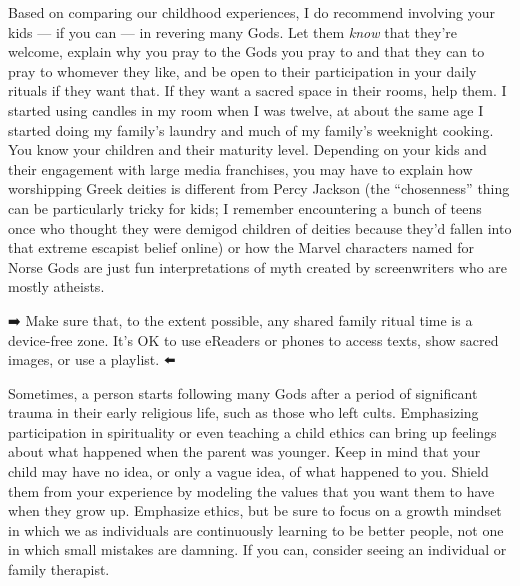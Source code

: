 \documentclass[
]{book}
\begin{document}
Based on comparing our childhood experiences, I do recommend involving your kids --- if you can --- in revering many Gods. Let them \emph{know} that they're welcome, explain why you pray to the Gods you pray to and that they can to pray to whomever they like, and be open to their participation in your daily rituals if they want that. If they want a sacred space in their rooms, help them. I started using candles in my room when I was twelve, at about the same age I started doing my family's laundry and much of my family's weeknight cooking. You know your children and their maturity level. Depending on your kids and their engagement with large media franchises, you may have to explain how worshipping Greek deities is different from Percy Jackson (the ``chosenness'' thing can be particularly tricky for kids; I remember encountering a bunch of teens once who thought they were demigod children of deities because they'd fallen into that extreme escapist belief online) or how the Marvel characters named for Norse Gods are just fun interpretations of myth created by screenwriters who are mostly atheists.

➡️ Make sure that, to the extent possible, any shared family ritual time is a device-free zone. It's OK to use eReaders or phones to access texts, show sacred images, or use a playlist. ⬅️

Sometimes, a person starts following many Gods after a period of significant trauma in their early religious life, such as those who left cults. Emphasizing participation in spirituality or even teaching a child ethics can bring up feelings about what happened when the parent was younger. Keep in mind that your child may have no idea, or only a vague idea, of what happened to you. Shield them from your experience by modeling the values that you want them to have when they grow up. Emphasize ethics, but be sure to focus on a growth mindset in which we as individuals are continuously learning to be better people, not one in which small mistakes are damning. If you can, consider seeing an individual or family therapist.
\end{document}

